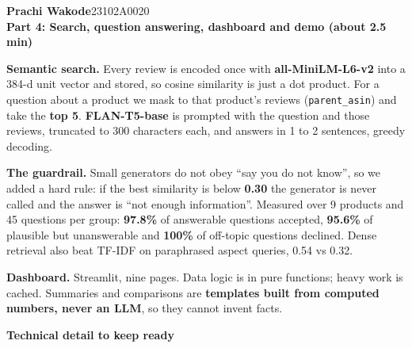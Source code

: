 \documentclass[10pt,a4paper]{article}
\newcommand{\lab}[1]{{\color{accent}\bfseries #1}}
\newcommand{\speaker}[3]{%
  \begin{tcolorbox}[colback=navy,colframe=navy,arc=3pt,left=8pt,right=8pt,top=4pt,bottom=4pt]
  {\color{white}\bfseries\Large #1}\hfill{\color{white!70!navy}\small #2}\\[1pt]{\color{accent!60!white}\bfseries #3}
  \end{tcolorbox}\vspace{-2pt}}
\begin{document}
\speaker{Prachi Wakode}{23102A0020}{Part 4: Search, question answering, dashboard and demo \quad (about 2.5 min)}
\begin{say}
\lab{Semantic search.} Every review is encoded once with \textbf{all-MiniLM-L6-v2} into a 384-d unit vector and stored, so cosine similarity is just a dot product. For a question about a product we mask to that product's reviews (\texttt{parent\_asin}) and take the \textbf{top 5}. \textbf{FLAN-T5-base} is prompted with the question and those reviews, truncated to 300 characters each, and answers in 1 to 2 sentences, greedy decoding.\par
\lab{The guardrail.} Small generators do not obey ``say you do not know'', so we added a hard rule: if the best similarity is below \textbf{0.30} the generator is never called and the answer is ``not enough information''. Measured over 9 products and 45 questions per group: \textbf{97.8\%} of answerable questions accepted, \textbf{95.6\%} of plausible but unanswerable and \textbf{100\%} of off-topic questions declined. Dense retrieval also beat TF-IDF on paraphrased aspect queries, 0.54 vs 0.32.\par
\lab{Dashboard.} Streamlit, nine pages. Data logic is in pure functions; heavy work is cached. Summaries and comparisons are \textbf{templates built from computed numbers, never an LLM}, so they cannot invent facts.
\end{say}
\par\vspace{2pt}\textbf{Technical detail to keep ready}\par
\end{document}
